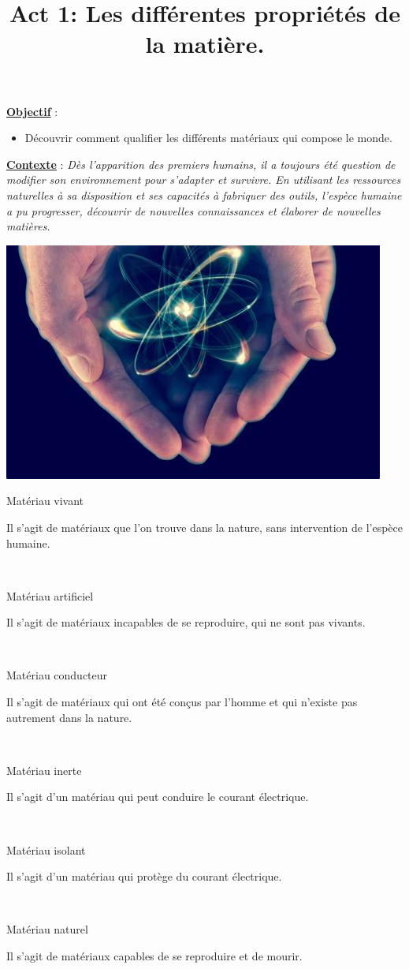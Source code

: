 \documentclass[10pt]{article}
\newcommand{\titreActivite}{\huge Act 1: Les différentes propriétés de la matière.} %
\newcommand{\objectif}{ 	
	
	\begin{itemize}
		\item Découvrir comment qualifier les différents matériaux qui compose le monde.
	\end{itemize}
} %
\newcommand{\contexte}{
	Dès l'apparition des premiers humains, il a toujours été question de modifier son
	environnement pour s’adapter et survivre.
	En utilisant les ressources naturelles à sa disposition et ses capacités à fabriquer des outils, l’espèce
	humaine a pu progresser, découvrir de nouvelles connaissances et élaborer de nouvelles matières.
}
\newcommand{\bullets}[2]{ 
	\begin{minipage}{3.75cm}
		#1
	\end{minipage}
	\begin{minipage}{0.1in}
		\bullet
	\end{minipage}
	\hfill
	\begin{minipage}{0.1in}
		\bullet
	\end{minipage}
	\begin{minipage}{10cm}
		#2
	\end{minipage}
	\vspace{10pt}\\
	}
\begin{document}
\date{}
\title{\titreActivite}
\maketitle %


\underline{\textbf{Objectif}} :  \vspace{2pt}
\objectif

\vspace{4pt}

\underline{\textbf{Contexte}} :  \textit{\contexte}

\begin{center}
	\includegraphics[width=0.55\columnwidth]{activité.jpg} %
\end{center}

\vspace{-12pt}



\begin{question}
\end{question} \vspace{10pt}

	\bullets{Matériau vivant}{Il s’agit de matériaux que l’on trouve dans la nature, sans intervention de l’espèce humaine. }
	\bullets{Matériau artificiel}{Il s’agit de matériaux incapables de se reproduire, qui ne sont pas vivants. }
	\bullets{Matériau conducteur}{Il s’agit de matériaux qui ont été conçus par l’homme et qui n’existe pas autrement dans la nature.}
	\bullets{Matériau inerte}{Il s’agit d’un matériau qui peut conduire le courant électrique.}
	\bullets{Matériau isolant}{Il s’agit d’un matériau qui protège du courant électrique.}
	\bullets{Matériau naturel}{Il s’agit de matériaux capables de se reproduire et de mourir.}
\end{document}
